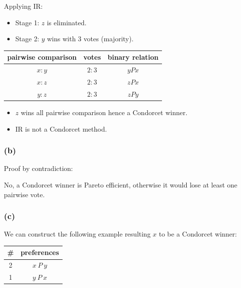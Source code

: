 \documentclass[a4paper]{article}
\begin{document}
Applying IR:
\begin{itemize}
    \item Stage 1: $z$ is eliminated.
    \item Stage 2: $y$ wins with 3 votes (majority).
\end{itemize}

\begin{table}[!htbp]
    \centering
    \begin{tabular}{ccc}
        pairwise comparison & votes  & binary relation \\
        \hline 
        $x:y$  & $2:3$  & $yPx$           \\
        $x:z$  & $2:3$  & $zPx$           \\
        $y:z$  & $2:3$  & $zPy$           \\
        \hline
    \end{tabular}
\end{table}

\begin{itemize}
    \item $z$ wins all pairwise comparison hence a Condorcet winner.
    \item IR is not a Condorcet method.
\end{itemize}

\subsubsection*{(b)}

Proof by contradiction:

No, a Condorcet winner is Pareto efficient, otherwise it would lose at least one pairwise vote.

\subsubsection*{(c)}

We can construct the following example resulting $x$ to be a Condorcet winner:

\begin{table}[!htbp]
    \centering
    \begin{tabular}{c|c|}
        \# & preferences         \\ 
        \hline
        2  & $x\: P\: y$ \\
        1  & $y\: P\: x$ \\
        \hline
    \end{tabular}
\end{table}
\end{document}
